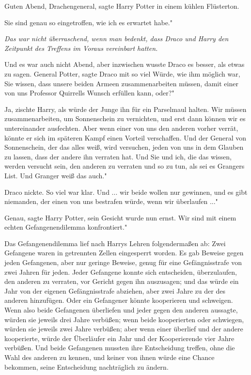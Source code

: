 \glqq Guten Abend, Drachengeneral\grqq{}, sagte Harry Potter in einem kühlen
Flüsterton.

\glqq Sie sind genau so eingetroffen, wie ich es erwartet habe."

\emph{ Das war nicht überraschend, wenn man bedenkt, dass Draco und Harry den Zeitpunkt des Treffens im Voraus vereinbart hatten.}

Und es war auch nicht Abend, aber inzwischen wusste Draco es besser, als etwas
zu sagen. \glqq General Potter\grqq{}, sagte Draco mit so viel Würde, wie ihm
möglich war, \glqq Sie wissen, dass unsere beiden Armeen zusammenarbeiten
müssen, damit einer von uns Professor Quirrells Wunsch erfüllen kann, oder?"

\glqq Ja\grqq{}, zischte Harry, als würde der Junge ihn für ein Parselmaul
halten. \glqq Wir müssen zusammenarbeiten, um Sonnenschein zu vernichten, und
erst dann können wir es untereinander ausfechten. Aber wenn einer von uns den
anderen vorher verrät, könnte er sich im späteren Kampf einen Vorteil
verschaffen. Und der General von Sonnenschein, der das alles weiß, wird
versuchen, jeden von uns in dem Glauben zu lassen, dass der andere ihn verraten
hat. Und Sie und ich, die das wissen, werden versucht sein, den anderen zu
verraten und so zu tun, als sei es Grangers List. Und Granger weiß das auch."

Draco nickte. So viel war klar. \glqq Und ... wir beide wollen nur gewinnen, und
es gibt niemanden, der einen von uns bestrafen würde, wenn wir überlaufen ..."

\glqq Genau\grqq{}, sagte Harry Potter, sein Gesicht wurde nun ernst. \glqq Wir
sind mit einem echten Gefangenendilemma konfrontiert."

Das Gefangenendilemma lief nach Harrys Lehren folgendermaßen ab: Zwei Gefangene
waren in getrennten Zellen eingesperrt worden. Es gab Beweise gegen jeden
Gefangenen, aber nur geringe Beweise, genug für eine Gefängnisstrafe von zwei
Jahren für jeden. Jeder Gefangene konnte sich entscheiden, überzulaufen, den
anderen zu verraten, vor Gericht gegen ihn auszusagen; und das würde ein Jahr
von der eigenen Gefängnisstrafe abziehen, aber zwei Jahre zu der des anderen
hinzufügen. Oder ein Gefangener könnte kooperieren und schweigen. Wenn also
beide Gefangenen überliefen und jeder gegen den anderen aussagte, würden sie
jeweils drei Jahre verbüßen; wenn beide kooperierten oder schwiegen, würden sie
jeweils zwei Jahre verbüßen; aber wenn einer überlief und der andere
kooperierte, würde der Überläufer ein Jahr und der Kooperierende vier Jahre
verbüßen. Und beide Gefangenen mussten ihre Entscheidung treffen, ohne die Wahl
des anderen zu kennen, und keiner von ihnen würde eine Chance bekommen, seine
Entscheidung nachträglich zu ändern.

